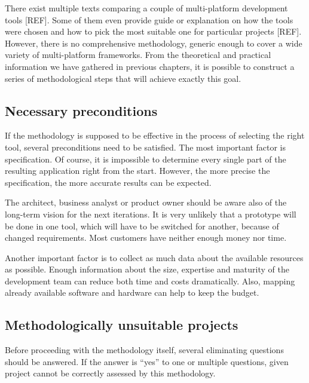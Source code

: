 \documentclass[english,master,public,dept460,male,cpdeclaration,oneside]{diploma}
\begin{document}
There exist multiple texts comparing a couple of multi-platform development tools [REF]. Some of them even provide guide or explanation on how the tools were chosen and how to pick the most suitable one for particular projects [REF]. However, there is no comprehensive methodology, generic enough to cover a wide variety of multi-platform frameworks. From the theoretical and practical information we have gathered in previous chapters, it is possible to construct a series of methodological steps that will achieve exactly this goal.

\subsection{Necessary preconditions}
If the methodology is supposed to be effective in the process of selecting the right tool, several preconditions need to be satisfied. The most important factor is specification. Of course, it is impossible to determine every single part of the resulting application right from the start. However, the more precise the specification, the more accurate results can be expected. 

The architect, business analyst or product owner should be aware also of the long-term vision for the next iterations. It is very unlikely that a prototype will be done in one tool, which will have to be switched for another, because of changed requirements. Most customers have neither enough money nor time.

Another important factor is to collect as much data about the available resources as possible. Enough information about the size, expertise and maturity of the development team can reduce both time and costs dramatically. Also, mapping already available software and hardware can help to keep the budget.

\subsection{Methodologically unsuitable projects}

Before proceeding with the methodology itself, several eliminating questions should be answered. If the answer is “yes” to one or multiple questions, given project cannot be correctly assessed by this methodology.
\end{document}
